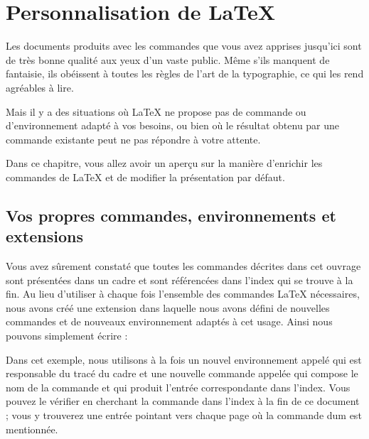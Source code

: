 

\chapter{Personnalisation de \LaTeX}

\begin{intro}
Les documents produits avec les commandes que vous avez apprises
jusqu'ici sont de très bonne qualité aux yeux d'un vaste public. Même s'ils
manquent de fantaisie, ils obéissent à toutes les règles de l'art de
la typographie, ce qui les rend agréables à lire.

Mais il y a des situations où \LaTeX{} ne propose pas de commande ou
d'environnement adapté à vos besoins, ou bien où le résultat obtenu par
une commande existante peut ne pas répondre  à votre attente.

Dans ce chapitre, vous allez avoir un aperçu sur la manière
d'enrichir les commandes de \LaTeX{} et de modifier la présentation
par défaut.
\end{intro}

\section{Vos propres commandes, environnements et extensions}

Vous avez sûrement constaté que toutes les commandes décrites dans cet
ouvrage sont présentées dans un cadre et sont référencées dans l'index
qui se trouve à la fin. Au lieu d'utiliser à chaque fois l'ensemble
des commandes \LaTeX{} nécessaires, nous avons créé une extension dans
laquelle nous avons défini de nouvelles commandes et de nouveaux
environnement adaptés à cet usage. Ainsi nous pouvons simplement
écrire :

\begin{example}
\begin{lscommand}
\end{lscommand}
\end{example}

Dans cet exemple, nous utilisons à la fois un nouvel environnement
appelé  qui est responsable du tracé du cadre et une
nouvelle commande appelée  qui compose le nom de la commande et
qui produit l'entrée correspondante dans l'index. Vous pouvez le
vérifier en cherchant la commande  dans l'index à la fin de ce
document ; vous
y trouverez une entrée pointant vers chaque page où la commande dum
est mentionnée.

